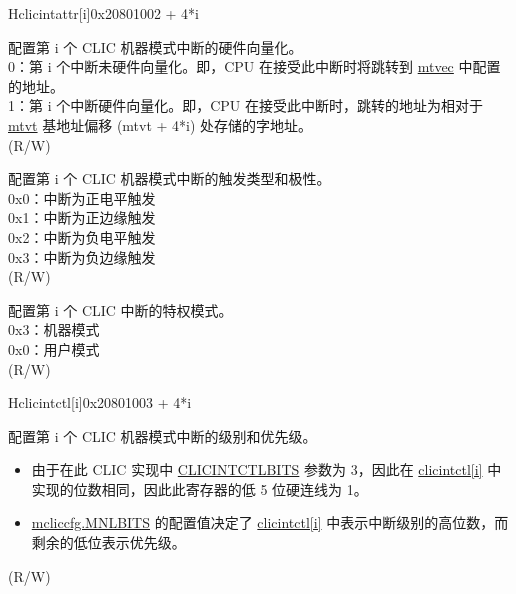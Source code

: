 \begin{register}{H}{{clicintattr[i]}}{0x20801002 + 4*i}\label{regdesc:MCLICINTATTR_REG_i}
%
%
%
%
\regnewline%
\begin{regdesc}
\begin{reglist}
\label{fielddesc:MCLICINTATTR_i_SHV}\item [{SHV}] 配置第 i 个 CLIC 机器模式中断的硬件向量化。 \\
0：第 i 个中断未硬件向量化。即，CPU 在接受此中断时将跳转到 \hyperref[fielddesc:MTVECBASE]{mtvec} 中配置的地址。 \\
1：第 i 个中断硬件向量化。即，CPU 在接受此中断时，跳转的地址为相对于 \hyperref[fielddesc:MTVTBASE]{mtvt} 基地址偏移 (mtvt + 4*i) 处存储的字地址。 \\
(R/W)
\label{fielddesc:MCLICINTATTR_i_TRIG}\item [{TRIG}] 配置第 i 个 CLIC 机器模式中断的触发类型和极性。 \\
0x0：中断为正电平触发 \\
0x1：中断为正边缘触发 \\
0x2：中断为负电平触发 \\
0x3：中断为负边缘触发 \\
(R/W)
\label{fielddesc:MCLICINTATTR_i_MODE}\item [{MODE}] 配置第 i 个 CLIC 中断的特权模式。 \\
0x3：机器模式\\
0x0：用户模式\\
(R/W)
\end{reglist}
\end{regdesc}
\end{register}

\begin{register}{H}{{clicintctl[i]}}{0x20801003 + 4*i}\label{regdesc:MCLICINTCTL_REG_i}
%
%
\regnewline%
\begin{regdesc}
\begin{reglist}
\label{fielddesc:MCLICINTCTL_i}\item [{CTL[i]}] 配置第 i 个 CLIC 机器模式中断的级别和优先级。 \\
\begin{itemize}
    \item 由于在此 CLIC 实现中 \hyperref[fielddesc:CLICINFO_CLICINTCTLBITS]{CLICINTCTLBITS} 参数为 3，因此在 \hyperref[regdesc:MCLICINTCTL_REG_i]{clicintctl[i]} 中实现的位数相同，因此此寄存器的低 5 位硬连线为 1。 \\
    \item \hyperref[fielddesc:MCLICCFG_MNLBITS]{mcliccfg.MNLBITS} 的配置值决定了 \hyperref[regdesc:MCLICINTCTL_REG_i]{clicintctl[i]} 中表示中断级别的高位数，而剩余的低位表示优先级。
\end{itemize}
(R/W)
\end{reglist}
\end{regdesc}
\end{register}
